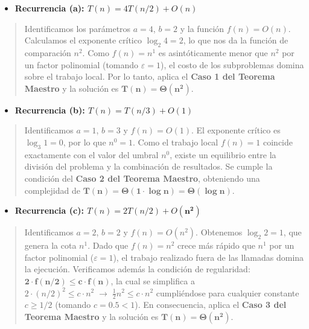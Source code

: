\documentclass[12pt,a4paper]{article}
\begin{document}
\begin{itemize}[leftmargin=*]
    \item \textbf{Recurrencia (a): $T(n) = 4T(n/2) + O(n)$}
\end{itemize}

\begin{quote}
Identificamos los parámetros $a = 4$, $b = 2$ y la función $f(n) = O(n)$. Calculamos el
exponente crítico $\log_2 4 = 2$, lo que nos da la función de comparación $n^2$. Como
$f(n) = n^1$ es asintóticamente menor que $n^2$ por un factor polinomial (tomando
$\varepsilon = 1$), el costo de los subproblemas domina sobre el trabajo local. Por lo
tanto, aplica el \textbf{Caso 1 del Teorema Maestro} y la solución es
$\mathbf{T(n) = \Theta(n^2)}$.
\end{quote}

\begin{itemize}[leftmargin=*]
    \item \textbf{Recurrencia (b): $T(n) = T(n/3) + O(1)$}
\end{itemize}

\begin{quote}
Identificamos $a = 1$, $b = 3$ y $f(n) = O(1)$. El exponente crítico es $\log_3 1 = 0$,
por lo que $n^0 = 1$. Como el trabajo local $f(n) = 1$ coincide exactamente con el valor
del umbral $n^0$, existe un equilibrio entre la división del problema y la combinación de
resultados. Se cumple la condición del \textbf{Caso 2 del Teorema Maestro}, obteniendo una
complejidad de $\mathbf{T(n) = \Theta(1 \cdot \log n) = \Theta(\log n)}$.
\end{quote}

\begin{itemize}[leftmargin=*]
    \item \textbf{Recurrencia (c): $T(n) = 2T(n/2) + O(\mathbf{n^2})$}
\end{itemize}

\begin{quote}
Identificamos $a = 2$, $b = 2$ y $f(n) = O(n^2)$. Obtenemos $\log_2 2 = 1$, que genera la
cota $n^1$. Dado que $f(n) = n^2$ crece más rápido que $n^1$ por un factor polinomial
($\varepsilon = 1$), el trabajo realizado fuera de las llamadas domina la ejecución.
Verificamos además la condición de regularidad: $\mathbf{2 \cdot f(n/2) \leq c \cdot f(n)}$,
la cual se simplifica a
$2 \cdot (n/2)^2 \leq c \cdot n^2 \;\rightarrow\; \frac{1}{2}n^2 \leq c \cdot n^2$
cumpliéndose para cualquier constante $c \geq 1/2$ (tomando $c = 0.5 < 1$). En consecuencia,
aplica el \textbf{Caso 3 del Teorema Maestro} y la solución es
$\mathbf{T(n) = \Theta(n^2)}$.
\end{quote}
\end{document}
